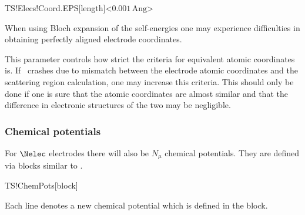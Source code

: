 \begin{fdfentry}{TS!Elecs!Coord.EPS}[length]<$0.001\,\mathrm{Ang}$>

  When using Bloch expansion of the self-energies one may experience
  difficulties in obtaining perfectly aligned electrode coordinates.

  This parameter controls how strict the criteria for equivalent
  atomic coordinates is. If \tsiesta\ crashes due to mismatch between
  the electrode atomic coordinates and the scattering region
  calculation, one may increase this criteria. This should only be
  done if one is sure that the atomic coordinates are almost similar
  and that the difference in electronic structures of the two may be
  negligible.
  
\end{fdfentry}


\subsubsection{Chemical potentials}
\label{sec:ts:chem-pot}

For $\Nelec$ electrodes there will also be $N_\mu$ chemical
potentials. They are defined via blocks similar to .

\begin{fdfentry}{TS!ChemPots}[block]
  
  Each line denotes a new chemical potential which is defined in the
   block.
  
\end{fdfentry}

